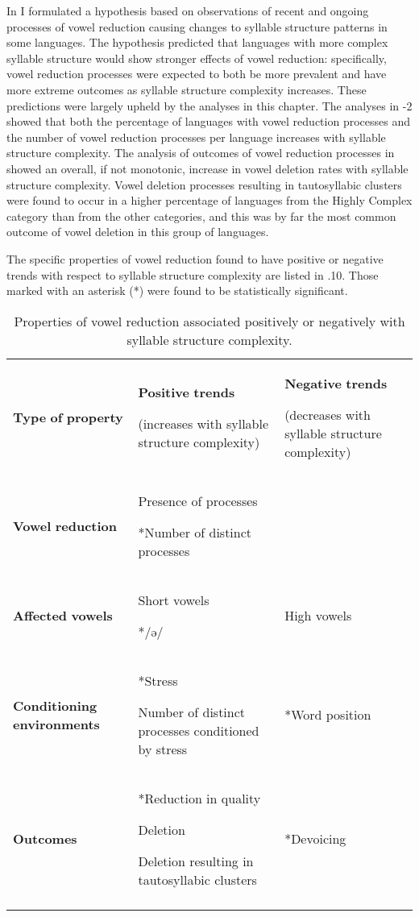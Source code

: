   In  I formulated a hypothesis based on observations of recent and ongoing processes of vowel reduction causing changes to syllable structure patterns in some languages. The hypothesis predicted that languages with more complex syllable structure would show stronger effects of vowel reduction: specifically, vowel reduction processes were expected to both be more prevalent and have more extreme outcomes as syllable structure complexity increases. These predictions were largely upheld by the analyses in this chapter. The analyses in -2 showed that both the percentage of languages with vowel reduction processes and the number of vowel reduction processes per language increases with syllable structure complexity. The analysis of outcomes of vowel reduction processes in  showed an overall, if not monotonic, increase in vowel deletion rates with syllable structure complexity. Vowel deletion processes resulting in tautosyllabic clusters were found to occur in a higher percentage of languages from the Highly Complex category than from the other categories, and this was by far the most common outcome of vowel deletion in this group of languages.



  The specific properties of vowel reduction found to have positive or negative trends with respect to syllable structure complexity are listed in .10. Those marked with an asterisk (*) were found to be statistically significant.






\begin{table}
\begin{tabularx}{\textwidth}{XXX}
\lsptoprule

\textbf{Type} \textbf{of} \textbf{property} & \textbf{Positive} \textbf{trends}

(increases with syllable structure complexity) & \textbf{Negative} \textbf{trends}

(decreases with syllable structure complexity)\\
\textbf{Vowel} \textbf{reduction} & Presence of processes

*Number of distinct processes & \\
\textbf{Affected} \textbf{vowels} & Short vowels

*/ə/ & High vowels\\
\textbf{Conditioning} \textbf{environments} & *Stress

Number of distinct processes conditioned by stress & *Word position\\
\textbf{Outcomes} & *Reduction in quality

Deletion

Deletion resulting in tautosyllabic clusters & *Devoicing\\
\lspbottomrule
\end{tabularx}
\caption{\label{6.10}Properties of vowel reduction associated positively or negatively with syllable structure complexity.}
\end{table}




